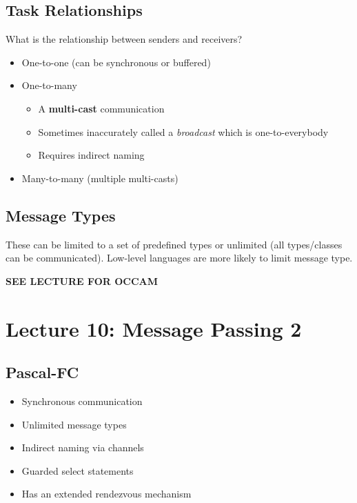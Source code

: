 \documentclass{article}
\begin{document}
\subsection{Task Relationships}
\label{sec:org38d6cf7}
What is the relationship between senders and receivers?
\begin{itemize}
\item One-to-one (can be synchronous or buffered)
\item One-to-many
\begin{itemize}
\item A \textbf{multi-cast} communication
\item Sometimes inaccurately called a \emph{broadcast} which is one-to-everybody
\item Requires indirect naming
\end{itemize}
\item Many-to-many (multiple multi-casts)
\end{itemize}

\subsection{Message Types}
\label{sec:org3c20629}
These can be limited to a set of predefined types or unlimited (all types/classes can be communicated).
Low-level languages are more likely to limit message type.

\textbf{SEE LECTURE FOR OCCAM}

\maketitle
\section{Lecture 10: Message Passing 2}


\subsection{Pascal-FC}
\label{sec:org4d6c208}
\begin{itemize}
\item Synchronous communication
\item Unlimited message types
\item Indirect naming via channels
\item Guarded select statements
\item Has an extended rendezvous mechanism
\end{itemize}
\end{document}
